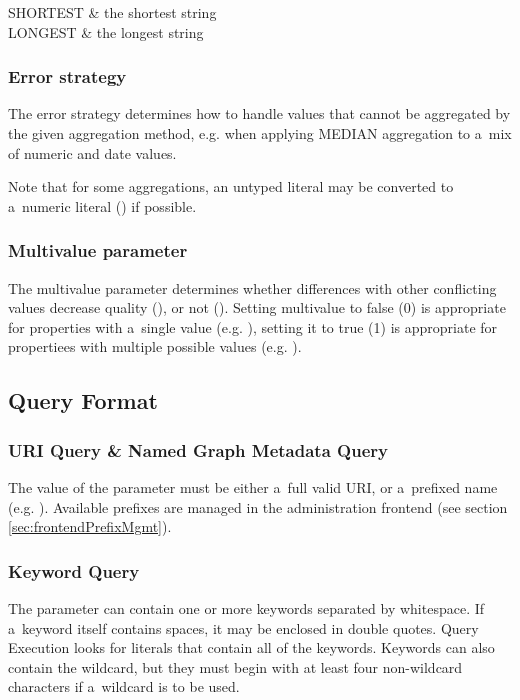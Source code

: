 \enumtable
{
	SHORTEST & the shortest string \\
	LONGEST & the longest string
}

\subsubsection*{Error strategy}
The error strategy determines how to handle values that cannot be aggregated by the given aggregation method, e.g. when applying MEDIAN aggregation to a~mix of numeric and date values.

Note that for some aggregations, an untyped literal may be converted to a~numeric literal () if possible.

\subsubsection*{Multivalue parameter}
The multivalue parameter determines whether differences with other conflicting values decrease quality (), or not (). Setting multivalue to false (0) is appropriate for properties with a~single value (e.g. ), setting it to true (1) is appropriate for propertiees with multiple possible values (e.g. ).


\subsection{Query Format}

\subsubsection{URI Query \& Named Graph Metadata Query}
The value of the  parameter must be either a~full valid URI, or a~prefixed name (e.g. ).  Available prefixes are managed in the administration frontend (see section \ref{sec:frontendPrefixMgmt}).

\subsubsection{Keyword Query}
The  parameter can contain one or more keywords separated by whitespace. If a~keyword itself contains spaces, it may be enclosed in double quotes. Query Execution looks for literals that contain all of the keywords. Keywords can also contain the \code{*} wildcard, but they must begin with at least four non-wildcard characters if a~wildcard is to be used.

